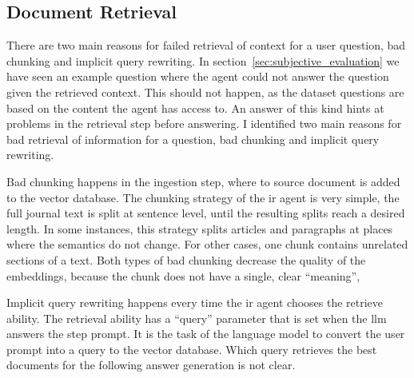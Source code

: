 \documentclass[../main.tex]{subfiles}
\begin{document}
\subsection{Document Retrieval}

There are two main reasons for failed retrieval of context for a user question,
bad chunking and implicit query rewriting.
In section~\ref{sec:subjective_evaluation} we have seen an example question where
the agent could not answer the question given the retrieved context.
This should not happen, as the dataset questions are based on the content the agent has access to.
An answer of this kind hints at problems in the retrieval step before answering.
I identified two main reasons for bad retrieval of information for a question,
bad chunking and implicit query rewriting.



Bad chunking happens in the ingestion step, where to source document is added to the
vector database.
The chunking strategy of the \gls{ir} agent is very simple, the full journal text
is split at sentence level, until the resulting splits reach a desired length.
In some instances, this strategy splits articles and paragraphs at places
where the semantics do not change.
For other cases, one chunk contains unrelated sections of a text.
Both types of bad chunking decrease the quality of the embeddings, because the
chunk does not have a single, clear ``meaning'',

Implicit query rewriting happens every time the \gls{ir} agent chooses the retrieve ability.
The retrieval ability has a ``query'' parameter that is set when the \gls{llm}
answers the step prompt.
It is the task of the language model to convert the user prompt into a query
to the vector database.
Which query retrieves the best documents for the following answer generation is not clear.
\end{document}
